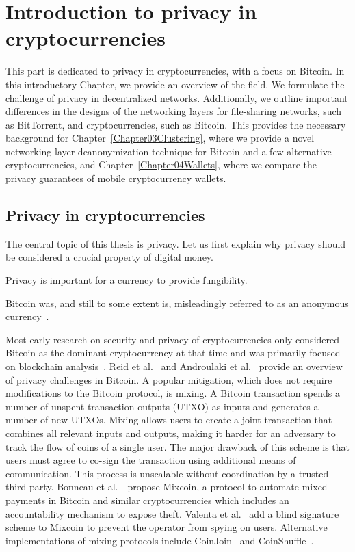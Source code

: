 \chapter{Introduction to privacy in cryptocurrencies}

\label{Chapter02IntroP2P}

This part is dedicated to privacy in cryptocurrencies, with a focus on Bitcoin.
In this introductory Chapter, we provide an overview of the field.
We formulate the challenge of privacy in decentralized networks.
Additionally, we outline important differences in the designs of the networking layers for file-sharing networks, such as BitTorrent, and cryptocurrencies, such as Bitcoin.
This provides the necessary background for Chapter~\ref{Chapter03Clustering}, where we provide a novel networking-layer deanonymization technique for Bitcoin and a few alternative cryptocurrencies, and Chapter~\ref{Chapter04Wallets}, where we compare the privacy guarantees of mobile cryptocurrency wallets.


\section{Privacy in cryptocurrencies}

The central topic of this thesis is privacy.
Let us first explain why privacy should be considered a crucial property of digital money.

Privacy is important for a currency to provide fungibility.


Bitcoin was, and still to some extent is, misleadingly referred to as an anonymous currency~\cite{Reid2011}.

Most early research on security and privacy of cryptocurrencies only considered Bitcoin as the dominant cryptocurrency at that time and was primarily focused on blockchain analysis~\cite{Meiklejohn2013, Ober2013, Ron2013}.
Reid et al.~\cite{Reid2011} and Androulaki et al.~\cite{Androulaki2013} provide an overview of privacy challenges in Bitcoin.
A popular mitigation, which does not require modifications to the Bitcoin protocol, is mixing.
A Bitcoin transaction spends a number of unspent transaction outputs (UTXO) as inputs and generates a number of new UTXOs.
Mixing allows users to create a joint transaction that combines all relevant inputs and outputs, making it harder for an adversary to track the flow of coins of a single user.
The major drawback of this scheme is that users must agree to co-sign the transaction using additional means of communication.
This process is unscalable without coordination by a trusted third party.
Bonneau et al.~\cite{Bonneau2014}~propose Mixcoin, a protocol to automate mixed payments in Bitcoin and similar cryptocurrencies which includes an accountability mechanism to expose theft.
Valenta et al.~\cite{Valenta2015} add a blind signature scheme to Mixcoin to prevent the operator from spying on users.
Alternative implementations of mixing protocols include CoinJoin~\cite{Maxwell2013} and CoinShuffle~\cite{Ruffing2014}.

